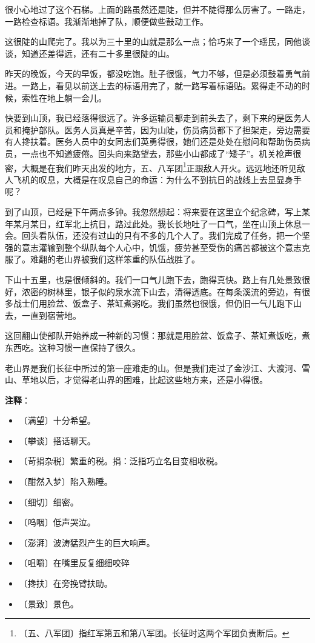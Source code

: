 \documentclass[12pt,UTF-8,openany]{ctexbook}
\begin{document}
\begin{large}
    很小心地过了这个石梯。上面的路虽然还是陡，但并不陡得那么厉害了。一路走，一路检查标语。我渐渐地掉了队，顺便做些鼓动工作。
    
    这很陡的山爬完了。我以为三十里的山就是那么一点；恰巧来了一个瑶民，同他谈谈，知道还差得远，还有二十多里很陡的山。
    
    昨天的晚饭，今天的早饭，都没吃饱。肚子很饿，气力不够，但是必须鼓着勇气前进。一路上，看见以前送上去的标语用完了，就一路写着标语贴。累得走不动的时候，索性在地上躺一会儿。
    
    快要到山顶，我已经落得很远了。许多运输员都走到前头去了，剩下来的是医务人员和掩护部队。医务人员真是辛苦，因为山陡，伤员病员都下了担架走，旁边需要有人搀扶着。医务人员中的女同志们英勇得很，她们还是处处在慰问和帮助伤员病员，一点也不知道疲倦。回头向来路望去，那些小山都成了“矮子”。机关枪声很密，大概是在我们昨天出发的地方，五、八军团\footnote{〔五、八军团〕指红军第五和第八军团。长征时这两个军团负责断后。}正跟敌人开火。远远地还听见敌人飞机的叹息，大概是在叹息自己的命运：为什么不到抗日的战线上去显显身手呢？
    
    到了山顶，已经是下午两点多钟。我忽然想起：将来要在这里立个纪念碑，写上某年某月某日，红军北上抗日，路过此处。我长长地吐了一口气，坐在山顶上休息一会。回头看队伍，还没有过山的只有不多的几个人了。我们完成了任务，把一个坚强的意志灌输到整个纵队每个人心中，饥饿，疲劳甚至受伤的痛苦都被这个意志克服了。难翻的老山界被我们这样笨重的队伍战胜了。
    
    下山十五里，也是很倾斜的。我们一口气儿跑下去，跑得真快。路上有几处景致很好，浓密的树林里，银子似的泉水流下山去，清得透底。在每条溪流的旁边，有很多战士们用脸盆、饭盒子、茶缸煮粥吃。我们虽然也很饿，但仍旧一气儿跑下山去，一直到宿营地。
    
    这回翻山使部队开始养成一种新的习惯：那就是用脸盆、饭盒子、茶缸煮饭吃，煮东西吃。这种习惯一直保持了很久。
    
    老山界是我们长征中所过的第一座难走的山。但是我们走过了金沙江、大渡河、雪山、草地以后，才觉得老山界的困难，比起这些地方来，还是小得很。
    
\end{large}


\newpage

\textbf{注释}：

\vspace{-1em}

\begin{itemize}
    \setlength\itemsep{-0.2em}
    \item 〔满望〕十分希望。
    \item 〔攀谈〕搭话聊天。
    \item 〔苛捐杂税〕繁重的税。捐：泛指巧立名目变相收税。
    \item 〔酣然入梦〕陷入熟睡。
    \item 〔细切〕细密。
    \item 〔呜咽〕低声哭泣。
    \item 〔澎湃〕波涛猛烈产生的巨大响声。
    \item 〔咀嚼〕在嘴里反复细细咬碎
    \item 〔搀扶〕在旁挽臂扶助。
    \item 〔景致〕景色。
\end{itemize}
\end{document}
